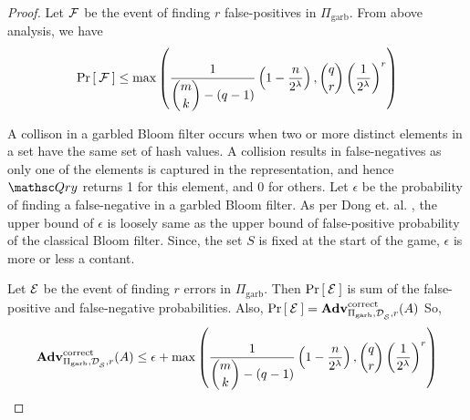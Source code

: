 \begin{proof}
Let ${\cal F}$ be the event of finding $r$ false-positives in $\Pi_{\mathrm{garb}}$. From above analysis, we have
\begin{align*}
\Pr\left[\: {\cal F} \:\right] \leq  \max\left(\dfrac{1}{\dbinom{m}{k}-(q-1)}\left(1-\dfrac{n}{2^\lambda}\right), \dbinom{q}{r}\left(\dfrac{1}{2^\lambda}\right)^r \right)
\end{align*}

A collison in a garbled Bloom filter occurs when two or more distinct elements in a set have the same set of hash values. A collision results in false-negatives as only one of the elements is captured in the representation, and hence $\Qry$ returns 1 for this element, and 0 for others. Let $\epsilon$ be the probability of finding a false-negative in a garbled Bloom filter. As per Dong et. al. \cite{dong2013private}, the upper bound of $\epsilon$  is loosely same as the upper bound of false-positive probability of the classical Bloom filter. Since, the set $S$ is fixed at the start of the game, $\epsilon$ is more or less a contant.

Let ${\cal E}$ be the event of finding $r$ errors in $\Pi_{\mathrm{garb}}$. Then $\Pr\left[\: {\cal E} \:\right]$ is sum of the false-positive and false-negative probabilities. Also, $\Pr\left[\: {\cal E} \:\right] = \mathrm{\mathbf{Adv}}^{\mathrm{correct}}_{\Pi_{\mathrm{garb}},\mathcal{D}_{{\cal S}}^{},r}(A)$ So, 
\begin{align*}
\mathrm{\mathbf{Adv}}^{\mathrm{correct}}_{\Pi_{\mathrm{garb}},\mathcal{D}_{{\cal S}}^{},r}(A) \leq \epsilon +  \max\left(\dfrac{1}{\dbinom{m}{k}-(q-1)}\left(1-\dfrac{n}{2^\lambda}\right), \dbinom{q}{r}\left(\dfrac{1}{2^\lambda}\right)^r \right)
\end{align*}

\end{proof}
